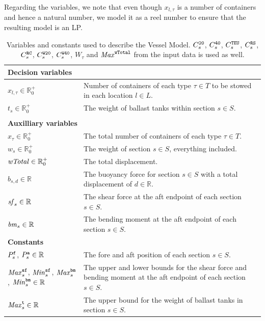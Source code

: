 Regarding the variables, we note that even though $x_{l,\tau}$ is a number of containers and hence a natural number, we model it as a reel number to ensure that the resulting model is an LP.  

\begin{table}[hbtp]
\centering
\begin{tabular}{p{3.5cm}p{9cm}}
\multicolumn{2}{l}{\textbf{Decision variables}}\\
\hline
$x_{l,\tau}\in \mathbb{R}^+_0$
		&Number of containers of each type $\tau\in T$ to be stowed in each location $l\in L$.\\
$t_s\in \mathbb{R}^+_0$
		& The weight of ballast tanks within section $s\in S$.\\
\\
\multicolumn{2}{l}{\textbf{Auxilliary variables}}\\
\hline
$x_\tau\in \mathbb{R}^+_0$ & The total number of containers of each type $\tau\in T$.\\
$w_s\in \mathbb{R}^+_0$	& The weight of section $s\in S$, everything included.\\
$\mathit{wTotal}\in \mathbb{R}^+_0$	& The total displacement.\\
$b_{s,d} \in\mathbb{R}$ & The buoyancy force for section $s \in S$ with a total displacement of $d\in \mathbb{R}$.\\
$\mathit{sf}_s\in \mathbb{R}$ & The shear force at the aft endpoint of each section $s\in S$.\\
$\mathit{bm}_s\in \mathbb{R}$ & The bending moment at the aft endpoint of each section $s\in S$.\\
%
\multicolumn{2}{l}{\textbf{Constants}}\\
\hline\noalign{\smallskip}
$P^{\texttt{f}}_s$, $P^{\texttt{a}}_s \in \mathbb{R}$ & The fore and aft position of each section $s \in S$.\\  
$\mathit{Max}^{\texttt{sf}}_s$, $\mathit{Min}^{\texttt{sf}}_s$, $\mathit{Max}^{\texttt{bm}}_s$, $\mathit{Min}^{\texttt{bm}}_s \in \mathbb{R}$ & The upper and lower bounds for the shear force and bending moment at the aft endpoint of each section $s\in S$.\\
$\mathit{Max}^{\texttt{t}}_s\in \mathbb{R}$ & The upper bound for the weight of ballast tanks in section $s\in S$.\\
\end{tabular}
\caption{Variables and constants used to describe the Vessel Model. $C_s^{\texttt{20}}$, $C_s^{\texttt{40}}$, $C_s^{\texttt{TEU}}$, $C_s^{\texttt{RS}}$, $C_s^{\texttt{RC}}$, $C_s^{\texttt{W20}}$, $C_s^{\texttt{W40}}$, $W_\tau$ and $\mathit{Max}^{\texttt{wTotal}}$ from the input data is used as well.}\label{table:constants}
\end{table}
%

